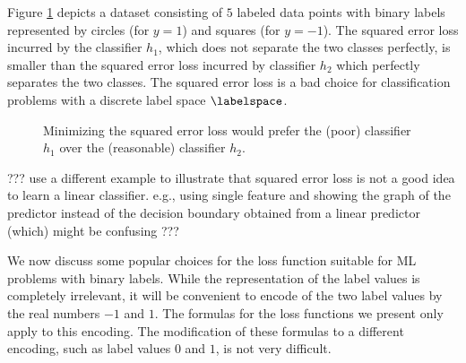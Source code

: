 \documentclass[12pt]{report}
\begin{document}
Figure \ref{fig_squarederrornotgoodclass} depicts a dataset consisting of $5$ labeled data points 
with binary labels represented by circles (for $y=1$) and squares (for $y=-1$). The squared error loss 
incurred by the classifier $h_{1}$, which does not separate the two classes perfectly, is smaller than 
the squared error loss incurred by classifier $h_{2}$ which perfectly separates the two classes. 
The squared error loss is a bad choice for classification problems with a discrete label space $\labelspace$. 
\begin{figure}[htbp]
\begin{center}
\caption{Minimizing the squared error loss would prefer the (poor) classifier $h_{1}$ 
	over the (reasonable) classifier $h_2$.}
\label{fig_squarederrornotgoodclass}
\end{center}
\end{figure}

??? use a different example to illustrate that squared error loss is not a good 
idea to learn a linear classifier. e.g., using single feature and showing the graph 
of the predictor instead of the decision boundary obtained from a linear predictor 
(which) might be confusing ??? 

We now discuss some popular choices for the loss function 
suitable for ML problems with binary labels. While the representation 
of the label values is completely irrelevant, it will be convenient to 
encode of the two label values by the real numbers $-1$ and $1$. 
The formulas for the loss functions we present only apply to 
this encoding. The modification of these formulas to a different 
encoding, such as label values $0$ and $1$, is not very difficult. 
\end{document}
